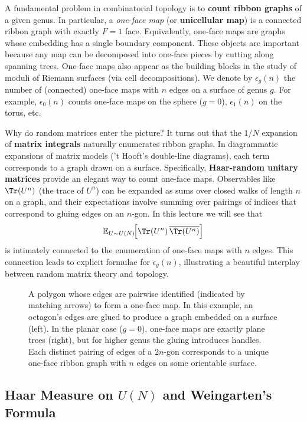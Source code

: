 \documentclass[letterpaper,11pt,oneside,reqno]{article}
\numberwithin{equation}{section}
\theoremstyle{definition}
\begin{document}
A fundamental problem in combinatorial topology is to \textbf{count ribbon graphs} of a given genus. In particular, a \emph{one-face map} (or \textbf{unicellular map}) is a connected ribbon graph with exactly $F=1$ face. Equivalently, one-face maps are graphs whose embedding has a single boundary component. These objects are important because any map can be decomposed into one-face pieces by cutting along spanning trees. One-face maps also appear as the building blocks in the study of moduli of Riemann surfaces (via cell decompositions). We denote by $\epsilon_g(n)$ the number of (connected) one-face maps with $n$ edges on a surface of genus $g$. For example, $\epsilon_0(n)$ counts one-face maps on the sphere ($g=0$), $\epsilon_1(n)$ on the torus, etc.

Why do random matrices enter the picture?  It turns out that the $1/N$ expansion of \textbf{matrix integrals} naturally enumerates ribbon graphs. In diagrammatic expansions of matrix models ('t Hooft's double-line diagrams), each term corresponds to a graph drawn on a surface. Specifically, \textbf{Haar-random unitary matrices} provide an elegant way to count one-face maps. Observables like $\Tr(U^n)$ (the trace of $U^n$) can be expanded as sums over closed walks of length $n$ on a graph, and their expectations involve summing over pairings of indices that correspond to gluing edges on an $n$-gon. In this lecture we will see that
\[ \mathbb{E}_{U\sim U(N)}\!\Big[\Tr(U^n)\,\overline{\Tr(U^n)}\Big] \]
is intimately connected to the enumeration of one-face maps with $n$ edges. This connection leads to explicit formulae for $\epsilon_g(n)$, illustrating a beautiful interplay between random matrix theory and topology.

\begin{figure}[h]
\centering
\caption{A polygon whose edges are pairwise identified (indicated by matching arrows) to form a one-face map. In this example, an octagon's edges are glued to produce a graph embedded on a surface (left). In the planar case ($g=0$), one-face maps are exactly plane trees (right), but for higher genus the gluing introduces handles. Each distinct pairing of edges of a $2n$-gon corresponds to a unique one-face ribbon graph with $n$ edges on some orientable surface.}
\end{figure}

\subsection*{Haar Measure on $U(N)$ and Weingarten's Formula}
\end{document}
